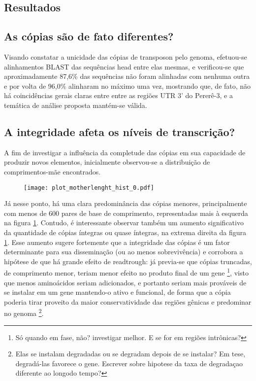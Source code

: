 \documentclass{article}
\begin{document}
\begin{multicols}{2}
\section{Resultados}

\subsection{As cópias são de fato diferentes?}
Visando constatar a unicidade das cópias de transposon pelo genoma, efetuou-se alinhamentos BLAST das sequências head entre elas mesmas, e verificou-se que aproximadamente 87,6\% das sequências não foram alinhadas com nenhuma outra e por volta de 96,0\% alinharam no máximo uma vez, mostrando que, de fato, não há coincidências gerais claras entre entre as regiões UTR 3' do Pererê-3, e a temática de análise proposta mantém-se válida.
\subsection{A integridade afeta os níveis de transcrição?}

A fim de investigar a influência da completude das cópias em sua capacidade de produzir novos elementos, inicialmente observou-se a distribuição de comprimentos-mãe encontrados.\\

\begin{figure}[H]
  \label{mlhist}
  \centering
  \texttt{[image: plot\_motherlenght\_hist\_0.pdf]}
\end{figure}

Já nesse ponto, há uma clara predominância das cópias menores, principalmente com menos de 600 pares de base de comprimento, representadas mais à esquerda na figura \ref{mlhist}. Contudo, é interessante observar também um aumento significativo da quantidade de cópias íntegras ou quase íntegras, na extrema direita da figura \ref{mlhist}. Esse aumento sugere fortemente que a integridade das cópias é um fator determinante para sua disseminação (ou ao menos sobrevivência) e corrobora a hipótese de que há grande efeito de readtrough: já previa-se que cópias truncadas, de comprimento menor, teriam menor efeito no produto final de um gene \footnote{Só quando em fase, não? investigar melhor. E se for em regiões intrônicas?}, visto que menos aminoácidos seriam adicionados, e portanto seriam mais prováveis de se instalar em um gene mantendo-o ativo e funcional, de forma que a cópia poderia tirar proveito da maior conservatividade das regiões gênicas e predominar no genoma \footnote{Elas se instalam degradadas ou se degradam depois de se instalar? Em tese, degradá-las favorece o gene. Escrever sobre hipotese da taxa de degradaçao diferente ao longodo tempo?}.\\


\end{multicols}
\end{document}
